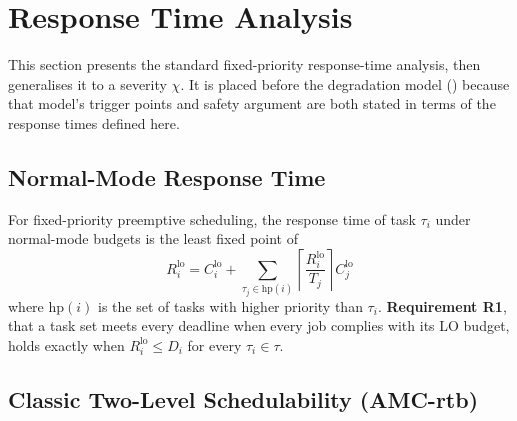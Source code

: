 \documentclass{article}
\begin{document}
\section{Response Time Analysis}
\label{sec:rta}

This section presents the standard fixed-priority response-time analysis, then
generalises it to a severity $\chi$. It is placed before the degradation model
() because that model's trigger points and safety argument
are both stated in terms of the response times defined here.

\subsection{Normal-Mode Response Time}
\label{sec:r-lo}

For fixed-priority preemptive scheduling, the response time of task $\tau_i$
under normal-mode budgets is the least fixed point of
\[
R_i^{\mathrm{lo}} = C_i^{\mathrm{lo}} + \sum_{\tau_j \in \mathrm{hp}(i)} \left\lceil \frac{R_i^{\mathrm{lo}}}{T_j} \right\rceil C_j^{\mathrm{lo}}
\]
where $\mathrm{hp}(i)$ is the set of tasks with higher priority than $\tau_i$.
\textbf{Requirement R1}, that a task set meets every deadline when every job
complies with its LO budget, holds exactly when $R_i^{\mathrm{lo}} \leq D_i$ for
every $\tau_i \in \tau$.

\subsection{Classic Two-Level Schedulability (AMC-rtb)}
\label{sec:amc-rtb}
\end{document}
